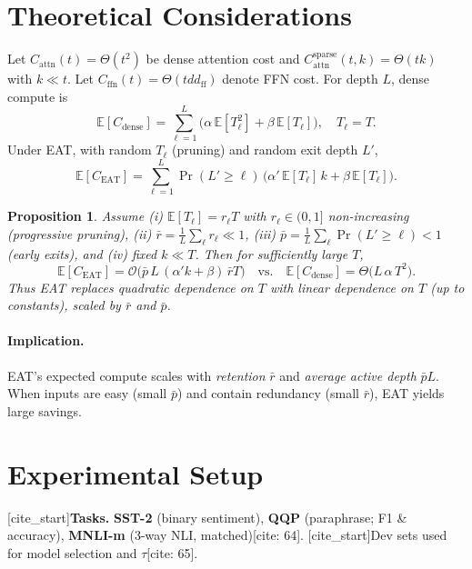 \documentclass[11pt,letterpaper]{article}
\theoremstyle{plain}
\newtheorem{proposition}{Proposition}
\newcommand{\eat}{\textsc{EAT}}
\begin{document}
\section{Theoretical Considerations}
Let $C_{\text{attn}}(t)=\Theta(t^2)$ be dense attention cost and $C_{\text{attn}}^{\text{sparse}}(t,k)=\Theta(tk)$ with $k\ll t$. Let $C_{\text{ffn}}(t)=\Theta(t d d_{\text{ff}})$ denote FFN cost. For depth $L$, dense compute is
\begin{equation}
\mathbb{E}[C_{\text{dense}}] = \sum_{\ell=1}^{L} \Big( \alpha\, \mathbb{E}[T_\ell^2] + \beta\, \mathbb{E}[T_\ell] \Big), \quad T_\ell=T.
\end{equation}
Under \eat{}, with random $T_\ell$ (pruning) and random exit depth $L'$,
\begin{equation}
\mathbb{E}[C_{\text{EAT}}] = \sum_{\ell=1}^{L} \Pr(L'\ge \ell)\,\Big( \alpha'\, \mathbb{E}[T_\ell]\, k + \beta\, \mathbb{E}[T_\ell] \Big).
\end{equation}

\begin{proposition}
Assume (i) $\mathbb{E}[T_\ell] = r_\ell T$ with $r_\ell\in(0,1]$ non-increasing (progressive pruning), (ii) $\bar{r}=\frac{1}{L}\sum_\ell r_\ell \ll 1$, (iii) $\bar{p}=\frac{1}{L}\sum_\ell \Pr(L'\ge \ell) < 1$ (early exits), and (iv) fixed $k\ll T$. Then for sufficiently large $T$,
\[
\mathbb{E}[C_{\text{EAT}}] = \mathcal{O}\!\Big( \bar{p}\, L \, (\alpha' k + \beta)\, \bar{r} T \Big)
\quad\text{vs.}\quad
\mathbb{E}[C_{\text{dense}}] = \Theta\!\big( L\,\alpha\,T^2 \big).
\]
Thus \eat{} replaces quadratic dependence on $T$ with linear dependence on $T$ (up to constants), scaled by $\bar{r}$ and $\bar{p}$.
\end{proposition}

\paragraph{Implication.} \eat{}'s expected compute scales with \emph{retention} $\bar{r}$ and \emph{average active depth} $\bar{p}L$. When inputs are easy (small $\bar{p}$) and contain redundancy (small $\bar{r}$), \eat{} yields large savings.

\section{Experimental Setup}
\label{sec:exp}
[cite_start]\textbf{Tasks.} \textbf{SST-2} (binary sentiment), \textbf{QQP} (paraphrase; F1 \& accuracy), \textbf{MNLI-m} (3-way NLI, matched)[cite: 64]. [cite_start]Dev sets used for model selection and $\tau$[cite: 65].
\end{document}
